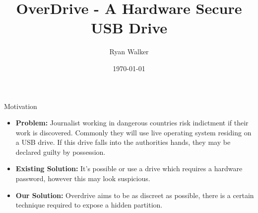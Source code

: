 \documentclass[aspectratio=169]{beamer}
\title{OverDrive - A Hardware Secure USB Drive}
\date{\today}
\author{Ryan Walker}
\institute{}
\begin{document}
\maketitle

\begin{frame}{Motivation}
\begin{itemize}
\item \textbf{Problem:}
    Journalist working in dangerous countries risk indictment if their work is
    discovered. Commonly they will use live operating system residing on a USB
    drive. If this drive falls into the authorities hands, they may be declared
    guilty by possession.

\item \textbf{Existing Solution:}
   It's possible or use a drive which requires a hardware password, however this
   may look suspicious.

\item \textbf{Our Solution:}
    Overdrive aims to be as discreet as possible, there is a certain technique
    required to expose a hidden partition.
\end{itemize}
\end{frame}

\end{document}
